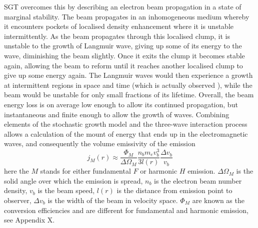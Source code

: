 SGT overcomes this by describing an electron beam propagation in a state of marginal stability. The beam propagates in an inhomogeneous medium whereby it encounters pockets of localised density enhancement where it is unstable intermittently. As the beam propagates through this localised clump, it is unstable to the growth of Langmuir wave, giving up some of its energy to the wave, diminishing the beam slightly. Once it exits the clump it becomes stable again, allowing the beam to reform until it reaches another localised clump to give up some energy again. The Langmuir waves would then experience a growth at intermittent regions in space and time (which is actually observed \citep{lin1986}), while the beam would be unstable for only small fractions of its lifetime. Overall, the beam energy loss is on average low enough to allow its continued propagation, but instantaneous and finite enough to allow the growth of waves. 
Combining elements of the stochastic growth model and the three-wave interaction process allows a calculation of the mount of energy that ends up in the electromagnetic waves, and consequently the volume emissivity of the emission \citep{robinson1993a, robinson1998}
\begin{equation}
j_M(r) \approx \frac{\Phi_M}{\Delta\Omega_M}\frac{n_b m_e v_b^3}{3l(r)}\frac{\Delta v_b}{v_b}
\end{equation}
here the $M$ stands for either fundamental $F$ or harmonic $H$ emission. $\Delta\Omega_M$ is the solid angle over which the  emission is spread, $n_b$ is the electron beam number density, $v_b$ is the beam speed, $l(r)$ is the distance from emission point to observer, $\Delta v_b$ is the width of the beam in velocity space. $\Phi_M$ are known as the conversion efficiencies and are different for fundamental and harmonic emission, see Appendix X.
